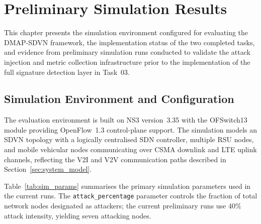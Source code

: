 \section{Preliminary Simulation Results}
\label{sec:prelim}

This chapter presents the simulation environment configured
for evaluating the DMAP-SDVN framework, the implementation
status of the two completed tasks, and evidence from
preliminary simulation runs conducted to validate the
attack injection and metric collection infrastructure
prior to the implementation of the full signature
detection layer in Task~03.

\subsection{Simulation Environment and Configuration}


The evaluation environment is built on NS3 version~3.35
with the OFSwitch13 module providing OpenFlow~1.3
control-plane support. The simulation models an SDVN
topology with a logically centralised SDN controller,
multiple RSU nodes, and mobile vehicular nodes
communicating over CSMA downlink and LTE uplink
channels, reflecting the V2I and V2V communication
paths described in Section~\ref{sec:system_model}.

Table~\ref{tab:sim_params} summarises the primary
simulation parameters used in the current runs. The
\texttt{attack\_percentage} parameter controls the
fraction of total network nodes designated as
attackers; the current preliminary runs use 40\%
attack intensity, yielding seven attacking nodes.

